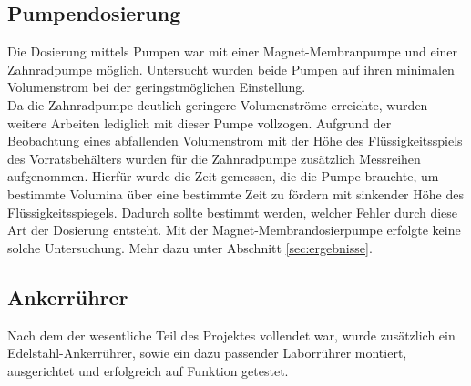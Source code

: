 \subsection{Pumpendosierung}
Die Dosierung mittels Pumpen war mit einer Magnet-Membranpumpe und einer Zahnradpumpe möglich. 
Untersucht wurden beide Pumpen auf ihren minimalen Volumenstrom bei der geringstmöglichen Einstellung.\\
Da die Zahnradpumpe deutlich geringere Volumenströme erreichte, wurden weitere Arbeiten lediglich mit dieser Pumpe vollzogen. Aufgrund der Beobachtung eines abfallenden Volumenstrom mit der Höhe des Flüssigkeitsspiels des Vorratsbehälters wurden für die Zahnradpumpe zusätzlich Messreihen aufgenommen. Hierfür wurde die Zeit gemessen, die die Pumpe brauchte, um bestimmte Volumina über eine bestimmte Zeit zu fördern mit sinkender Höhe des Flüssigkeitsspiegels. Dadurch sollte bestimmt werden, welcher Fehler durch diese Art der Dosierung entsteht. Mit der Magnet-Membrandosierpumpe erfolgte keine solche Untersuchung. Mehr dazu unter Abschnitt \ref{sec:ergebnisse}.

\subsection{Ankerrührer}
Nach dem der wesentliche Teil des Projektes vollendet war, wurde zusätzlich ein Edelstahl-Ankerrührer, sowie ein dazu passender Laborrührer montiert, ausgerichtet und erfolgreich auf Funktion getestet.
